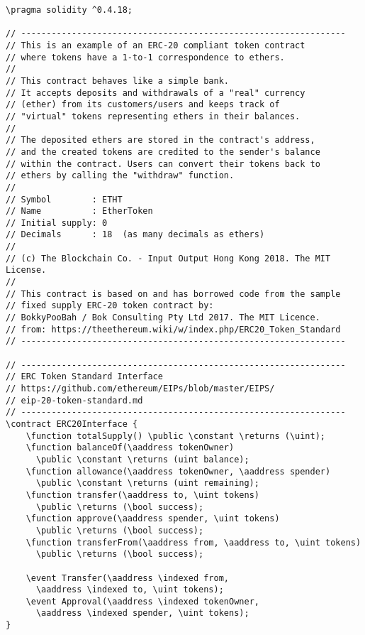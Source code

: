 \documentclass{llncs}
\newcommand{\red}[1]{\textcolor[rgb]{1,0,0}{#1}}
\newcommand{\blue}[1]{\textcolor[rgb]{0,0,1}{#1}}
\newcommand{\brown}[1]{\textcolor[rgb]{0.8,0.6,0.4}{#1}}
\newcommand{\verbsize}{\small}
\newcommand{\pragma}{\red{pragma}}
\newcommand{\contract}{\red{contract}}
\newcommand{\function}{\blue{function}}
\newcommand{\event}{\blue{event}}
\newcommand{\returns}{\blue{returns}}
\newcommand{\public}{\blue{public}}
\newcommand{\constant}{\blue{constant}}
\newcommand{\indexed}{\blue{indexed}}
\newcommand{\uint}{\brown{uint}}
\newcommand{\bool}{\brown{bool}}
\newcommand{\aaddress}{\brown{address}}
\begin{document}
\begin{small}
\begin{Verbatim}[commandchars=\\\?\?,fontsize=\verbsize]
\pragma solidity ^0.4.18;
 
// ----------------------------------------------------------------
// This is an example of an ERC-20 compliant token contract 
// where tokens have a 1-to-1 correspondence to ethers.
//
// This contract behaves like a simple bank. 
// It accepts deposits and withdrawals of a "real" currency 
// (ether) from its customers/users and keeps track of 
// "virtual" tokens representing ethers in their balances.
//
// The deposited ethers are stored in the contract's address, 
// and the created tokens are credited to the sender's balance 
// within the contract. Users can convert their tokens back to 
// ethers by calling the "withdraw" function.
//
// Symbol        : ETHT
// Name          : EtherToken
// Initial supply: 0
// Decimals      : 18  (as many decimals as ethers)
//
// (c) The Blockchain Co. - Input Output Hong Kong 2018. The MIT License.
//
// This contract is based on and has borrowed code from the sample 
// fixed supply ERC-20 token contract by:
// BokkyPooBah / Bok Consulting Pty Ltd 2017. The MIT Licence.
// from: https://theethereum.wiki/w/index.php/ERC20_Token_Standard
// ----------------------------------------------------------------

// ----------------------------------------------------------------
// ERC Token Standard Interface
// https://github.com/ethereum/EIPs/blob/master/EIPS/
// eip-20-token-standard.md
// ----------------------------------------------------------------
\contract ERC20Interface {
    \function totalSupply() \public \constant \returns (\uint);
    \function balanceOf(\aaddress tokenOwner) 
      \public \constant \returns (uint balance);
    \function allowance(\aaddress tokenOwner, \aaddress spender) 
      \public \constant \returns (uint remaining);
    \function transfer(\aaddress to, \uint tokens) 
      \public \returns (\bool success);
    \function approve(\aaddress spender, \uint tokens) 
      \public \returns (\bool success);
    \function transferFrom(\aaddress from, \aaddress to, \uint tokens)
      \public \returns (\bool success);

    \event Transfer(\aaddress \indexed from, 
      \aaddress \indexed to, \uint tokens);
    \event Approval(\aaddress \indexed tokenOwner, 
      \aaddress \indexed spender, \uint tokens);
}


\end{Verbatim}
\end{small}
\end{document}
